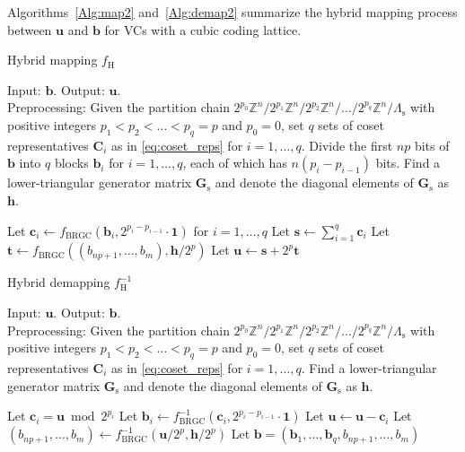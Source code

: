 \documentclass[journal]{IEEEtran}
\newcommand{\Z}{\mathbb{Z}}
\newcommand{\bb}{\boldsymbol{b}}
\newcommand{\bc}{\boldsymbol{c}}
\newcommand{\bh}{\boldsymbol{h}}
\newcommand{\bs}{\boldsymbol{s}}
\newcommand{\bt}{\boldsymbol{t}}
\newcommand{\bu}{\boldsymbol{u}}
\newcommand{\bx}{\boldsymbol{x}}
\newcommand{\bC}{\boldsymbol{C}}
\newcommand{\bGs}{\boldsymbol{G}_\mathrm{s}}
\newcommand{\bone}{\boldsymbol{1}}
\newcommand{\Lambdas}{\Lambda_\mathrm{s}}
\begin{document}
Algorithms~\ref{Alg:map2} and~\ref{Alg:demap2} summarize the hybrid mapping process between $\bu$ and $\bb$ for VCs with a cubic coding lattice. 
\begin{algorithm}[tbp]
	\caption{Hybrid mapping $f_{\text{H}}$}\label{Alg:map2} 
	Input: $\bb$. Output: $\bu$.\\
       Preprocessing: Given the partition chain $2^{p_0}\Z^n/2^{p_1}\Z^n/2^{p_2}\Z^n/\dots/2^{p_q}\Z^n/\Lambdas$ with positive integers ${p_1<p_2<\ldots<p_q=p}$ and $p_0=0$, set $q$ sets of coset representatives $\bC_i$ as in \eqref{eq:coset_reps} for $i=1,\ldots,q$. Divide the first $np$ bits of $\bb$ into $q$ blocks $\bb_i$ for $i=1,\ldots,q$, each of which has $n(p_i-p_{i-1})$ bits. Find a lower-triangular generator matrix $\bGs$ and denote the diagonal elements of $\bGs$ as $\bh$.
	\begin{algorithmic}[1]
	    \State Let $\bc_i \leftarrow f_{\text{BRGC}}(\bb_i,2^{p_i-p_{i-1}}\cdot\bone)$ for $i=1,\ldots,q$
     \State Let $\bs \leftarrow \sum_{i=1}^q\bc_i$
	    \State Let $\bt \leftarrow f_{\text{BRGC}}\left((b_{np+1},\ldots,b_{m}),\bh/2^{p}\right)$
	    \State Let $\bu \leftarrow \bs +2^{p}\bt$
	\end{algorithmic} 
\end{algorithm}

\begin{algorithm}[tbp]
	\caption{Hybrid demapping $f^{-1}_{\text{H}}$} \label{Alg:demap2} 
	Input: $\bu$. Output: $\bb$.\\
       Preprocessing: Given the partition chain $2^{p_0}\Z^n/2^{p_1}\Z^n/2^{p_2}\Z^n/\dots/2^{p_q}\Z^n/\Lambdas$ with positive integers ${p_1<p_2<\ldots<p_q=p}$ and $p_0=0$, set $q$ sets of coset representatives $\bC_i$ as in \eqref{eq:coset_reps} for $i=1,\ldots,q$. Find a lower-triangular generator matrix $\bGs$ and denote the diagonal elements of $\bGs$ as $\bh$.
	\begin{algorithmic}[1]
        \State Let $\bc_i=\bu \bmod 2^{p_i}$
        \State Let $\bb_i \leftarrow f^{-1}_{\text{BRGC}}(\bc_i,2^{p_i-p_{i-1}}\cdot\bone)$
	\State Let $\bu \leftarrow \bu - \bc_i $
	    \EndFor
        \State Let $\left(b_{np+1},\ldots,b_{m}\right) \leftarrow f^{-1}_{\text{BRGC}}(\bu/2^{p},\bh/2^{p})$
        \State Let $\bb=(\bb_1,\ldots,\bb_q,b_{np+1},\dots,b_m)$
	\end{algorithmic} 
\end{algorithm}
\end{document}
